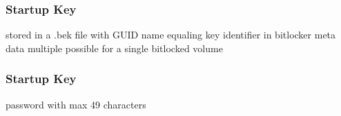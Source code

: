 \subsubsection{Startup Key}
stored in a .bek file with GUID name equaling key identifier in bitlocker meta data
multiple possible for a single bitlocked volume

\subsubsection{Startup Key}
password with max 49 characters